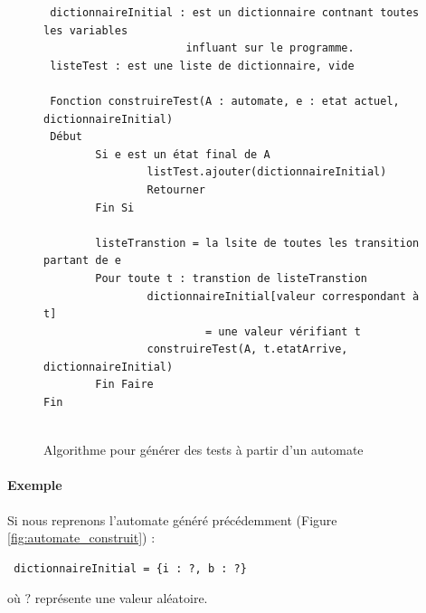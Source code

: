 \begin{figure}[H]
\centering
\begin{verbatim}
 dictionnaireInitial : est un dictionnaire contnant toutes les variables
                      influant sur le programme.
 listeTest : est une liste de dictionnaire, vide
 
 Fonction construireTest(A : automate, e : etat actuel, dictionnaireInitial)
 Début
        Si e est un état final de A
                listTest.ajouter(dictionnaireInitial)
                Retourner
        Fin Si
        
        listeTranstion = la lsite de toutes les transition partant de e
        Pour toute t : transtion de listeTranstion
                dictionnaireInitial[valeur correspondant à t] 
                         = une valeur vérifiant t
                construireTest(A, t.etatArrive, dictionnaireInitial)
        Fin Faire
Fin
        
\end{verbatim}
\caption{Algorithme pour générer des tests à partir d'un automate}
\end{figure}

\paragraph{Exemple}
Si nous reprenons l'automate généré précédemment (Figure 
\ref{fig:automate_construit}) :

\begin{verbatim}
 dictionnaireInitial = {i : ?, b : ?}
\end{verbatim}
où $?$ représente une valeur aléatoire.

